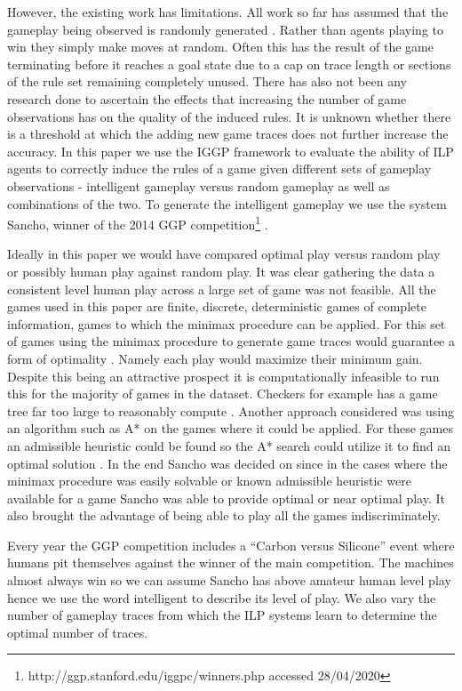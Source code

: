 However, the existing work has limitations. All work so far has assumed that the gameplay being observed is randomly generated \cite{Cropper/IGGP}. Rather than agents playing to win they simply make moves at random. Often this has the result of the game terminating before it reaches a goal state due to a cap on trace length or sections of the rule set remaining completely unused. There has also not been any research done to ascertain the effects that increasing the number of game observations has on the quality of the induced rules. It is unknown whether there is a threshold at which the adding new game traces does not further increase the accuracy. In this paper we use the IGGP framework to evaluate the ability of ILP agents to correctly induce the rules of a game given different sets of gameplay observations - intelligent gameplay versus random gameplay as well as combinations of the two. To generate the intelligent gameplay we use the system Sancho, winner of the 2014 GGP competition\footnote{http://ggp.stanford.edu/iggpc/winners.php accessed 28/04/2020} \cite{Sancho/Github}. 

Ideally in this paper we would have compared optimal play versus random play or possibly human play against random play. It was clear gathering the data a consistent level human play across a large set of game was not feasible. All the games used in this paper are finite, discrete, deterministic games of complete information, games to which the minimax procedure can be applied. For this set of games using the minimax procedure to generate game traces would guarantee a form of optimality \cite{IntroToAlgorithms}. Namely each play would maximize their minimum gain. Despite this being an attractive prospect it is computationally infeasible to run this for the majority of games in the dataset. Checkers for example has a game tree far too large to reasonably compute \cite{Schaeffer/Checkers}. Another approach considered was using an algorithm such as A* on the games where it could be applied. For these games an admissible heuristic could be found so the A* search could utilize it to find an optimal solution \cite{IntroToAlgorithms}. In the end Sancho was decided on since in the cases where the minimax procedure was easily solvable or known admissible heuristic were available for a game Sancho was able to provide optimal or near optimal play. It also brought the advantage of being able to play all the games indiscriminately.

Every year the GGP competition includes a ``Carbon versus Silicone'' event where humans pit themselves against the winner of the main competition. The machines almost always win \cite{Genesereth/GGPOverview} so we can assume Sancho has above amateur human level play hence we use the word intelligent to describe its level of play. We also vary the number of gameplay traces from which the ILP systems learn to determine the optimal number of traces.


